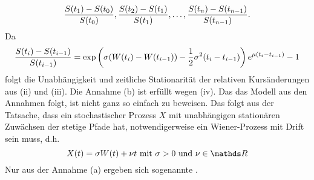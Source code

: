 \begin{itemize}
	\[
	\frac{S(t_1)-S(t_0)}{S(t_0)},\frac{S(t_2)-S(t_1)}{S(t_1)}, \dots ,\frac{S(t_n)-S(t_{n-1})}{S(t_{n-1})}.
	\]
	Da
	\[
	\frac{S(t_i)-S(t_{i-1})}{S(t_{i-1})}= \exp\left( \sigma(W(t_i)-W(t_{i-1}))-\frac{1}{2}\sigma^2(t_i-t_{i-1})\right)e^{\mu(t_i-t_{i-1})}-1
	\]
	folgt die Unabhängigkeit und zeitliche Stationarität der relativen Kursänderungen aus (ii) und (iii).
	Die Annahme (b) ist erfüllt wegen (iv).
	Das das Modell aus den Annahmen folgt, ist nicht ganz so einfach zu beweisen.
	Das folgt aus der Tatsache, dass ein stochastischer Prozess $X$ mit unabhängigen stationären Zuwächsen der stetige Pfade hat, notwendigerweise ein Wiener-Prozess mit Drift sein muss, d.h.
	\[
	X(t)=\sigma W(t)+\nu t\text{ mit }\sigma>0\text{ und }\nu\in\R
	\]
	Nur aus der Annahme (a) ergeben sich sogenannte .
\end{itemize}

